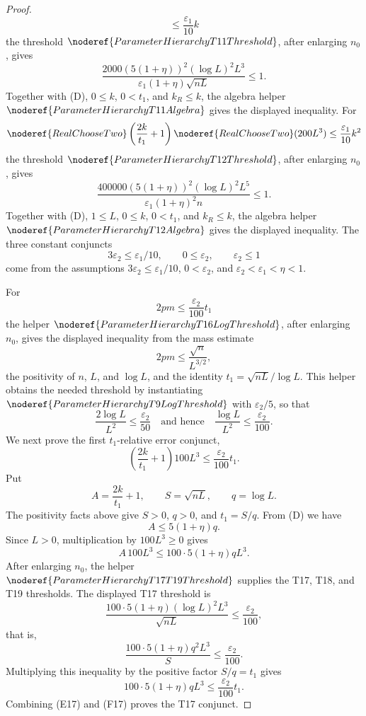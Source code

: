 \begin{proof}
\[\le\frac{\varepsilon_1}{10}k
\]
the threshold \(\noderef{ParameterHierarchyT11Threshold}\), after enlarging
\(n_0\), gives
\[
\frac{2000(5(1+\eta))^2(\log L)^2L^3}
{\varepsilon_1(1+\eta)\sqrt{nL}}\le1. \tag{T11}
\]
Together with (D), \(0\le k\), \(0<t_1\), and \(k_R\le k\), the algebra
helper \(\noderef{ParameterHierarchyT11Algebra}\) gives the displayed
inequality.
For
\[
\noderef{RealChooseTwo}\left(\frac{2k}{t_1}+1\right)
\noderef{RealChooseTwo}(200L^3)\le\frac{\varepsilon_1}{10}k^2
\]
the threshold \(\noderef{ParameterHierarchyT12Threshold}\), after
enlarging \(n_0\), gives
\[
\frac{400000(5(1+\eta))^2(\log L)^2L^5}
{\varepsilon_1(1+\eta)^2n}\le1. \tag{T12}
\]
Together with (D), \(1\le L\), \(0\le k\), \(0<t_1\), and \(k_R\le k\),
the algebra helper \(\noderef{ParameterHierarchyT12Algebra}\) gives the
displayed inequality.
The three constant conjuncts
\[
3\varepsilon_2\le\varepsilon_1/10,\qquad
0\le\varepsilon_2,\qquad
\varepsilon_2\le1
\]
come from the assumptions \(3\varepsilon_2\le\varepsilon_1/10\),
\(0<\varepsilon_2\), and \(\varepsilon_2<\varepsilon_1<\eta<1\).

For
\[
2pm\le\frac{\varepsilon_2}{100}t_1
\]
the helper \(\noderef{ParameterHierarchyT16LogThreshold}\), after enlarging
\(n_0\), gives the displayed inequality from the mass estimate
\[
2pm\le\frac{\sqrt n}{L^{3/2}},
\]
the positivity of \(n\), \(L\), and \(\log L\), and the identity
\(t_1=\sqrt{nL}/\log L\).  This helper obtains the needed threshold by
instantiating \(\noderef{ParameterHierarchyT9LogThreshold}\) with
\(\varepsilon_2/5\), so that
\[
\frac{2\log L}{L^2}\le\frac{\varepsilon_2}{50}
\quad\text{and hence}\quad
\frac{\log L}{L^2}\le\frac{\varepsilon_2}{100}. \tag{T16}
\]
We next prove the first \(t_1\)-relative error conjunct,
\[
\left(\frac{2k}{t_1}+1\right)100L^3
\le\frac{\varepsilon_2}{100}t_1.
\]
Put
\[
A=\frac{2k}{t_1}+1,\qquad S=\sqrt{nL},\qquad q=\log L.
\]
The positivity facts above give \(S>0\), \(q>0\), and \(t_1=S/q\).  From
(D) we have
\[
A\le 5(1+\eta)q.
\]
Since \(L>0\), multiplication by \(100L^3\ge0\) gives
\[
A\,100L^3\le 100\cdot5(1+\eta)qL^3. \tag{E17}
\]
After enlarging \(n_0\), the helper
\(\noderef{ParameterHierarchyT17T19Threshold}\) supplies the T17, T18, and
T19 thresholds.
The displayed T17 threshold is
\[
\frac{100\cdot5(1+\eta)(\log L)^2L^3}{\sqrt{nL}}
\le\frac{\varepsilon_2}{100}, \tag{T17}
\]
that is,
\[
\frac{100\cdot5(1+\eta)q^2L^3}{S}
\le\frac{\varepsilon_2}{100}.
\]
Multiplying this inequality by the positive factor \(S/q=t_1\) gives
\[
100\cdot5(1+\eta)qL^3
\le\frac{\varepsilon_2}{100}t_1. \tag{F17}
\]
Combining (E17) and (F17) proves the T17 conjunct.


\end{proof}
